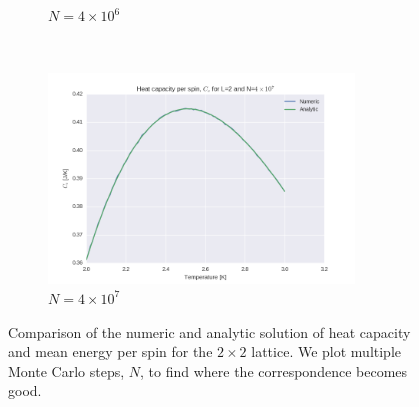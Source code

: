 \documentclass[a4paper, 10pt]{article}
\begin{document}
\begin{figure}[!ht]
\begin{subfigure}[H!]{0.5\textwidth}
        \caption{$N=4\times 10^6$}
    \end{subfigure}%
    ~ 
    \begin{subfigure}[H!]{0.5\textwidth}
        \centering
        \includegraphics[height=2.2in]{L2Cv4e7.png}
        \caption{$N=4\times 10^7$}
    \end{subfigure}
    \caption{Comparison of the numeric and analytic solution of heat capacity and mean energy per spin for the $2\times 2$ lattice. We plot multiple Monte Carlo steps, $N$, to find where the correspondence becomes good.}\label{fig:2x2_nsteps}
\end{figure}
\end{document}
